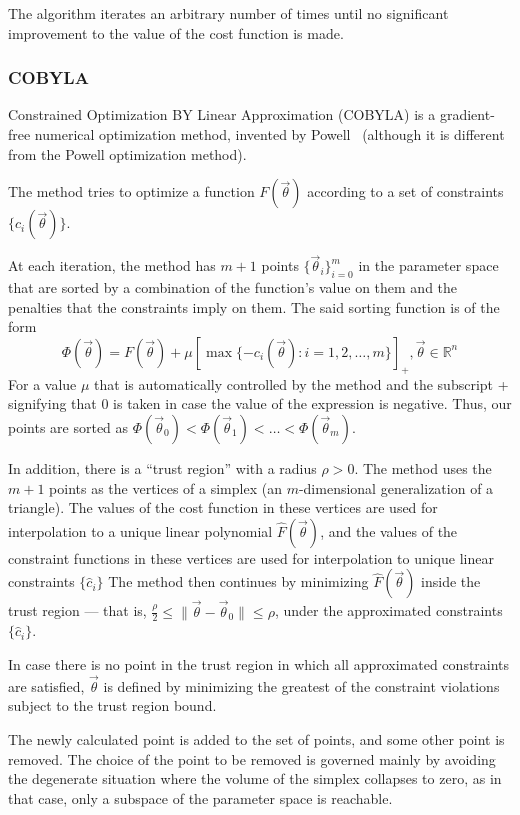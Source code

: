 \documentclass[a4paper,12pt]{article}
\newcommand{\thetas}{\vec{\theta}}
\begin{document}
The algorithm iterates an arbitrary number of times until no significant improvement to the value of the cost function is made.


\subsubsection{COBYLA}
Constrained Optimization BY Linear Approximation (COBYLA) is a gradient-free numerical optimization method, invented by Powell~\cite{Powell1994,powell_view_2007} (although it is different from the Powell optimization method).

The method tries to optimize a function $F(\thetas)$ according to a set of constraints $\{c_i(\thetas)\}$.

At each iteration, the method has $m+1$ points $\{\thetas_i\}_{i=0}^m$ in the parameter space that are sorted by a combination of the function's value on them and the penalties that the constraints imply on them.
The said sorting function is of the form
\begin{equation}
    \Phi(\thetas) = F(\thetas) + \mu[ \max\{-c_i(\thetas) : i=1,2,\dots,m \} ]_+, \thetas \in \mathbb{R}^n
\end{equation}
For a value $\mu$ that is automatically controlled by the method and the subscript + signifying that 0 is taken in case the value of the expression is negative.
Thus, our points are sorted as $\Phi(\thetas_0) < \Phi(\thetas_1) < \dots < \Phi(\thetas_m)$.

In addition, there is a ``trust region'' with a radius $\rho>0$. The method uses the $m+1$ points as the vertices of a simplex (an $m$-dimensional generalization of a triangle).
The values of the cost function in these vertices are used for interpolation to a unique linear polynomial $\hat{F}(\thetas)$, and the values of the constraint functions in these vertices are used for interpolation to unique linear constraints $\{\hat{c}_i\}$
The method then continues by minimizing $\hat{F}(\thetas)$ inside the trust region --- that is, $\frac{\rho}{2} \leq \|\thetas - \thetas_0\| \leq \rho$, under the approximated constraints $\{\hat{c}_i\}$.

In case there is no point in the trust region in which all approximated constraints are satisfied, $\thetas$ is defined by minimizing the greatest of the constraint violations subject to the trust region bound.

The newly calculated point is added to the set of points, and some other point is removed.
The choice of the point to be removed is governed mainly by avoiding the degenerate situation where the volume of the simplex collapses to zero, as in that case, only a subspace of the parameter space is reachable.
\end{document}
